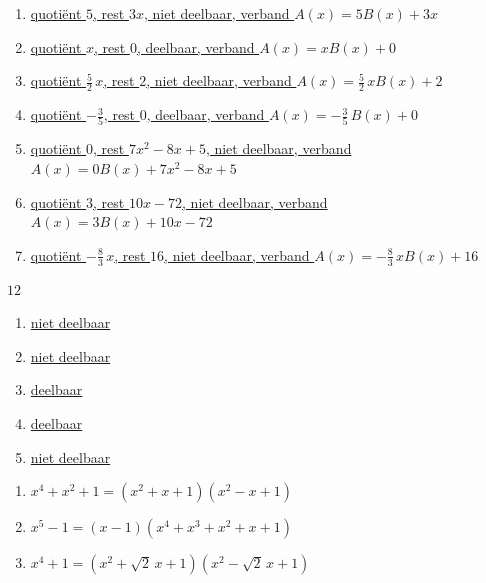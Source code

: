 \documentclass{ximera}
\begin{document}
\begin{Antwoord} \label{antw2.5}
\begin{enumerate}
\item
\hyperlink{oef2.5}{quoti\"ent $5$, rest $3x$, niet deelbaar, verband $A(x) = 5B(x)+3x$}
\item
\hyperlink{oef2.5}{quoti\"ent $x$, rest $0$, deelbaar, verband $A(x) = xB(x)+0$}
\item
\hyperlink{oef2.5}{quoti\"ent $\frac{5}{2}\,x$, rest $2$, niet deelbaar, verband $A(x) = \frac{5}{2}\,xB(x)+2$}
\item
\hyperlink{oef2.5}{quoti\"ent $-\frac{3}{5}$, rest $0$, deelbaar, verband $A(x) = -\frac{3}{5}\,B(x)+0$}
\item
\hyperlink{oef2.5}{quoti\"ent $0$, rest $7x^2-8x+5$, niet deelbaar, verband $A(x) = 0B(x)+7x^2-8x+5$}
\item
\hyperlink{oef2.5}{quoti\"ent $3$, rest $10x-72$, niet deelbaar, verband $A(x) = 3B(x)+10x-72$}
\item
\hyperlink{oef2.5}{quoti\"ent $-\frac{8}{3}\,x$, rest $16$, niet deelbaar, verband $A(x) = -\frac{8}{3}\,xB(x)+16$}
\end{enumerate}
\end{Antwoord}

\begin{Antwoord} \label{antw2.6}
\hyperlink{oef2.6}{$12$}
\end{Antwoord}

\begin{Antwoord} \label{antw2.7}
\begin{enumerate}
\item
\hyperlink{oef2.7}{niet deelbaar}
\item
\hyperlink{oef2.7}{niet deelbaar}
\item
\hyperlink{oef2.7}{deelbaar}
\item
\hyperlink{oef2.7}{deelbaar}
\item
\hyperlink{oef2.7}{niet deelbaar}
\end{enumerate}
\end{Antwoord}

\begin{Antwoord} \label{antw2.8}
\begin{enumerate}
\item
\hyperlink{oef2.8}{$x^4 + x^2 + 1 = (x^2+x+1)(x^2-x+1)$}
\item
\hyperlink{oef2.8}{$x^5 - 1 = (x-1)(x^4+x^3+x^2+x+1)$}
\item
\hyperlink{oef2.8}{$x^4 + 1 = (x^2+\sqrt{2}\,x+1)(x^2-\sqrt{2}\,x+1)$}
\end{enumerate}
\end{Antwoord}
\end{document}
